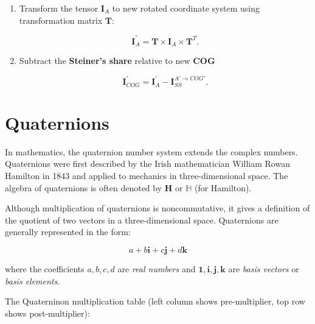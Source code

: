 \begin{itemize}
\begin{enumerate}
            \item Transform the tensor $\mathbf{I}_{A}$ to new rotated coordinate
                system using transformation matrix $\mathbf{T}$:

                \begin{equation}
                    \mathbf{I}_{A}^{'} = \mathbf{T} \times \mathbf{I}_{A} \times \mathbf{T}^{T}
                .\end{equation}

            \item Subtract the \textbf{Steiner's share} relative to new \textbf{COG}

                \begin{equation}
                    \mathbf{I}_{COG}^{'} = \mathbf{I}_{A}^{'} - \mathbf{I}_{SS}^{A' \to COG'}
                .\end{equation}

        \end{enumerate}

\end{itemize}


\newpage

\section{Quaternions}

In mathematics, the quaternion number system extends the complex numbers.
Quaternions were first described by the Irish mathematician William Rowan
Hamilton in 1843 and applied to mechanics in three-dimensional space.
The algebra of quaternions is often denoted by $  \mathbf{H} $
or $ \mathbb{H} $ (for Hamilton).

Although multiplication of quaternions is noncommutative, it gives a definition
of the quotient of two vectors in a three-dimensional space.
Quaternions are generally represented in the form:

\begin{equation}
    a + b \mathbf{i} + c \mathbf{j} + d \mathbf{k}
\end{equation}

where the coefficients $ a, b, c, d $ are \textit{real numbers} and
$ \mathbf{1}, \mathbf{i}, \mathbf{j}, \mathbf{k} $ are \textit{basis vectors} or
\textit{basis elements}.

The Quaterninon multiplication table (left column shows pre-multiplier, top
row shows post-multiplier):

